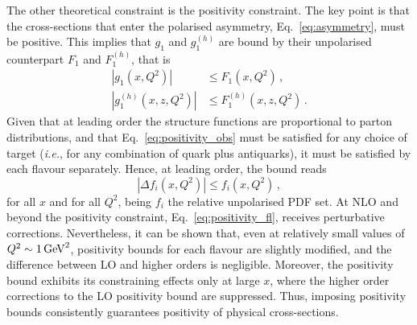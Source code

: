 The other theoretical constraint is the positivity constraint. The key point is that the cross-sections that enter the polarised asymmetry, Eq.~\eqref{eq:asymmetry}, must be positive. This implies that $g_1$ and $g_1^{(h)}$ are bound by their unpolarised counterpart $F_1$ and $F_1^{(h)}$, that is
\begin{equation}
  \begin{split}
    \left| g_1 (x,Q^2)  \right|& \leq F_1(x, Q^2) \,,\\
    \left| g_1^{(h)} (x,z,Q^2)  \right|& \leq F_1^{(h)}(x, z, Q^2) \,.
  \end{split}
  \label{eq:positivity_obs}
\end{equation}
Given that at leading order the structure functions are proportional to parton distributions, and that Eq.~\eqref{eq:positivity_obs} must be satisfied for any choice of target (\textit{i.e.}, for any combination of quark plus antiquarks), it must be satisfied by each flavour separately. Hence, at leading order, the bound reads
\begin{equation}
  \left| \Delta f_i (x,Q^2) \right| \leq f_i (x,Q^2) \,,
  \label{eq:positivity_fl}
\end{equation}
for all $x$ and for all $Q^2$, being $f_i$ the relative unpolarised PDF set. At NLO and beyond the positivity constraint, Eq.~\eqref{eq:positivity_fl}, receives perturbative corrections. Nevertheless, it can be shown \cite{Altarelli:1998gn} that, even at relatively small values of $Q^2 \sim 1 \, \textrm{GeV}^2$, positivity bounds for each flavour are slightly modified, and the difference between LO and higher orders is negligible. Moreover, the positivity bound exhibits its constraining effects only at large $x$, where the higher order corrections to the LO positivity bound are suppressed. Thus, imposing positivity bounds consistently guarantees positivity of physical cross-sections.%


